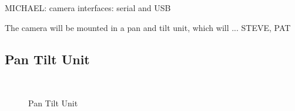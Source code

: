 \documentclass[10pt]{report}
\begin{document}
MICHAEL: camera interfaces: serial and USB 

The camera will be mounted in a pan and tilt unit, which will ... STEVE, PAT

\subsection{Pan Tilt Unit}


\begin{figure}
	\centering
\\
	\caption{Pan Tilt Unit}
	\label{fig:pantilt}
\end{figure}
\end{document}
